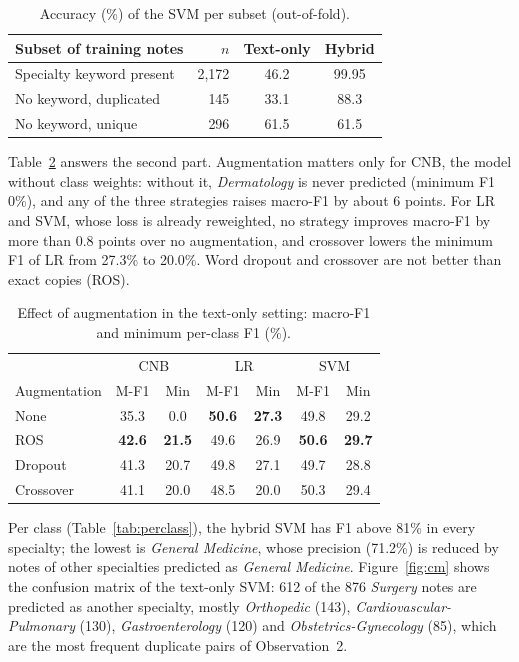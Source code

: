 \documentclass[twocolumn,10pt]{article}
\newcommand{\svm}{SVM\xspace}
\newcommand{\lr}{LR\xspace}
\newcommand{\cnb}{CNB\xspace}
\newcommand{\ros}{ROS\xspace}
\newcommand{\spec}[1]{\textit{#1}}
\begin{document}
\begin{table}[t]
\centering\small
\begin{tabular}{lrcc}
\toprule
Subset of training notes & $n$ & Text-only & Hybrid \\
\midrule
Specialty keyword present & 2,172 & 46.2 & 99.95 \\
No keyword, duplicated & 145 & 33.1 & 88.3 \\
No keyword, unique & 296 & 61.5 & 61.5 \\
\bottomrule
\end{tabular}
\caption{Accuracy (\%) of the \svm per subset (out-of-fold).}
\label{tab:subset}
\end{table}

Table~\ref{tab:aug} answers the second part. Augmentation matters only for \cnb, the model without class weights: without it, \spec{Dermatology} is never predicted (minimum F1 0\%), and any of the three strategies raises macro-F1 by about 6 points. For \lr and \svm, whose loss is already reweighted, no strategy improves macro-F1 by more than 0.8 points over no augmentation, and crossover lowers the minimum F1 of \lr from 27.3\% to 20.0\%. Word dropout and crossover are not better than exact copies (\ros).

\begin{table}[t]
\centering\small
\setlength{\tabcolsep}{3.5pt}
\begin{tabular}{lcccccc}
\toprule
 & \multicolumn{2}{c}{\cnb} & \multicolumn{2}{c}{\lr} & \multicolumn{2}{c}{\svm} \\
Augmentation & M-F1 & Min & M-F1 & Min & M-F1 & Min \\
\midrule
None      & 35.3 & 0.0  & \textbf{50.6} & \textbf{27.3} & 49.8 & 29.2 \\
\ros      & \textbf{42.6} & \textbf{21.5} & 49.6 & 26.9 & \textbf{50.6} & \textbf{29.7} \\
Dropout   & 41.3 & 20.7 & 49.8 & 27.1 & 49.7 & 28.8 \\
Crossover & 41.1 & 20.0 & 48.5 & 20.0 & 50.3 & 29.4 \\
\bottomrule
\end{tabular}
\caption{Effect of augmentation in the text-only setting: macro-F1 and minimum per-class F1 (\%).}
\label{tab:aug}
\end{table}

Per class (Table~\ref{tab:perclass}), the hybrid \svm has F1 above 81\% in every specialty; the lowest is \spec{General Medicine}, whose precision (71.2\%) is reduced by notes of other specialties predicted as \spec{General Medicine}. Figure~\ref{fig:cm} shows the confusion matrix of the text-only \svm: 612 of the 876 \spec{Surgery} notes are predicted as another specialty, mostly \spec{Orthopedic} (143), \spec{Cardiovascular-Pulmonary} (130), \spec{Gastroenterology} (120) and \spec{Obstetrics-Gynecology} (85), which are the most frequent duplicate pairs of Observation~2.
\end{document}
